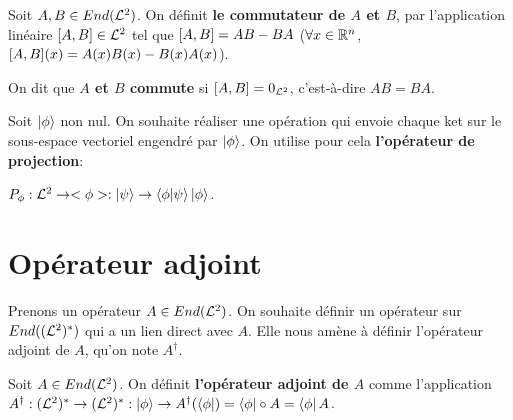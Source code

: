\begin{definition} [Commutateur]
	Soit $A, B \in End(\mathcal{L}^{2})$. On définit \textbf{le commutateur
	de $A$ et $B$}, par l'application linéaire $\comm{A}{B} \in \Ldeux$ tel que
	$\comm{A}{B} = AB - BA$ ($\forall x \in \mathbb{R}^{n}$, $\comm{A}{B}(x) =
	A(x)B(x) - B(x)A(x)$).

	On dit que \textbf{$A$ et $B$ commute} si $\comm{A}{B} = 0_{\Ldeux}$,
	c'est-à-dire $AB = BA$.
\end{definition}

\begin{exemple}
	Soit $\ket{\phi}$ non nul. On souhaite réaliser une opération qui envoie
	chaque ket sur le sous-espace vectoriel engendré par $\ket{\phi}$. On
	utilise pour cela \textbf{l'opérateur de projection}:

	$P_{\phi} : \mathcal{L}^{2} \rightarrow <\phi> : \ket{\psi} \rightarrow
	\bra{\phi}\ket{\psi} \ket{\phi}$.
\end{exemple}




\section{Opérateur adjoint}

Prenons un opérateur $A \in End(\mathcal{L}^{2})$. On souhaite définir un
opérateur sur $End((\mathcal{L}^{2})^{*})$ qui a un lien direct avec $A$. Elle
nous amène à définir l'opérateur adjoint de $A$, qu'on note $A^{\dagger}$.

\begin{definition}
	Soit $A \in End(\mathcal{L}^{2})$. On définit \textbf{l'opérateur adjoint
	de $A$} comme l'application $A^{\dagger} : (\mathcal{L}^{2})^{*} \rightarrow (\mathcal{L}^{2})^{*} :
	\ket{\phi} \rightarrow A^{\dagger}(\bra{\phi}) = \bra{\phi} \circ A =
	\bra{\phi} A$.
\end{definition}

